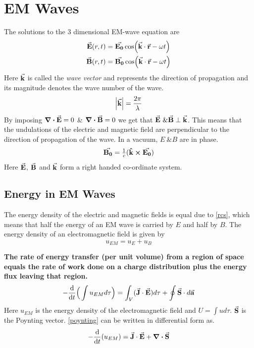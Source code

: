 \documentclass[12pt, oneside]{book}
\begin{document}
\chapter{EM Waves}
The solutions to the 3 dimensional EM-wave equation are
\begin{align}
	\va{E}(r,t)&=\va{E_0}\cos(\va{k}\cdot\va{r}-\omega t) \\
	\va{B}(r,t)&=\va{B_0}\cos(\va{k}\cdot\va{r}-\omega t)
\end{align}
Here $\va{k}$ is called the \textit{wave vector} and represents the direction of propagation and its magnitude denotes the wave number of the wave. 
\begin{equation}
	\abs{\va{k}}=\frac{2\pi}{\lambda}
\end{equation}
By imposing $\div{\va{E}}=0$ \& $\div{\va{B}}=0$ we get that $\va{E}\ \& \va{B} \perp \va{k}$. This means that the undulations of the electric and magnetic field are perpendicular to the direction of propagation of the wave. In a vacuum, $E\ \& B$ are in phase. 
\begin{equation}
	\va{B_0}=\tfrac{1}{c}(\vu{k}\cross\va{E_0})\label{rcs}
\end{equation}
Here $\va{E}$, $\va{B}$ and $\va{k}$ form a right handed co-ordinate system. 
\section{Energy in EM Waves}
The energy density of the electric and magnetic fields is equal due to \eqref{rcs}, which means that half the energy of an EM wave is carried by $E$ and half by $B$. The energy density of an electromagnetic field is given by
\begin{equation}
	\boxed{u_{EM}=u_E+u_B}
\end{equation}
\begin{tcolorbox}[title=Poynting's Theorem,colback=yellow!5!white,colframe=yellow!50!black]
	\textbf{The rate of energy transfer (per unit volume) from a region of space equals the rate of work done on a charge distribution plus the energy flux leaving that region.}
	\begin{equation}
		-\dv{t}\Big(\int u_{EM}d\tau\Big)=\int_V (\va{J}\cdot\va{E})d\tau+\oint\va{S}\cdot d\va{a}\label{poynting}
	\end{equation}
Here $u_{EM}$ is the energy density of the electromagnetic field and $U=\int ud\tau$. $\va{S}$ is the Poynting vector. \eqref{poynting} can be written in differential form as.
\begin{equation}
	-\dv{t}(u_{EM})=\va{J}\cdot\va{E}+\div{\va{S}}
\end{equation}
\end{tcolorbox}
\end{document}
